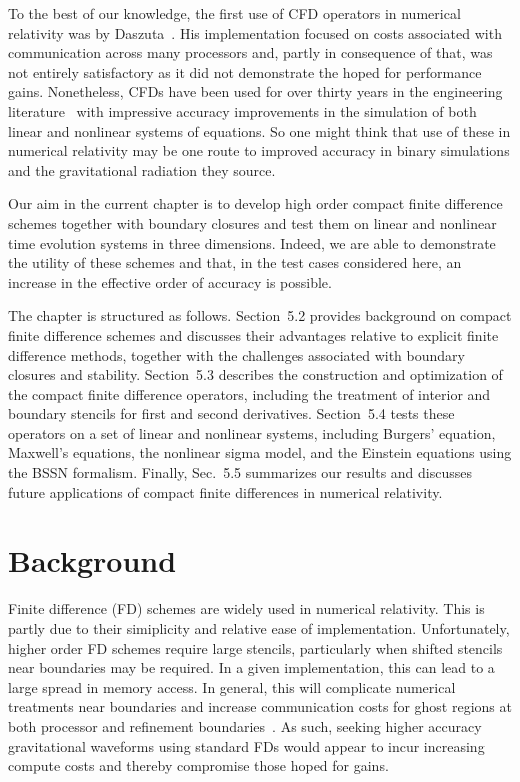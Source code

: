 To the best of our knowledge, the first use of CFD operators in numerical
relativity was by Daszuta~\cite{Daszuta2024}.  His implementation
focused on costs associated with communication across many processors and,
partly in consequence of that, was not entirely satisfactory as it did not
demonstrate the hoped for performance gains.
Nonetheless, CFDs have been used for over thirty years in the engineering
literature~\cite{Lele1992,Kim2007,WuKim2024,VisbalGaitonde2002,BradyLivescu2019} with impressive accuracy improvements
in the simulation of both linear and nonlinear systems of equations.  So one might think that use of these in numerical relativity may be one route to improved accuracy in binary simulations and the gravitational radiation they source.

Our aim in the current chapter is to develop high order compact finite difference schemes together with boundary closures and test them on linear and nonlinear time evolution systems in three dimensions.
Indeed, we are able to demonstrate the utility of these schemes and that, in the test cases considered here, an increase in the effective order of accuracy is possible.


The chapter is structured as follows. Section~5.2 provides background on compact finite difference schemes and discusses their advantages relative to explicit finite difference methods, together with the challenges associated with boundary closures and stability. Section~5.3 describes the construction and optimization of the compact finite difference operators, including the treatment of interior and boundary stencils for first and second derivatives. Section~5.4 tests these operators on a set of linear and nonlinear systems, including Burgers' equation, Maxwell's equations, the nonlinear sigma model, and the Einstein equations using the BSSN formalism. Finally, Sec.~5.5 summarizes our results and discusses future applications of compact finite differences in numerical relativity.
\section{Background}
\label{sec:background}

Finite difference (FD) schemes are widely used in numerical relativity.  This is partly due to their simiplicity and relative ease of implementation. Unfortunately,
higher order FD schemes require large stencils, particularly when shifted stencils near boundaries may be required.  In a given implementation, this can lead to a large spread in memory access.  In general, this will 
complicate numerical treatments near boundaries and increase 
communication costs for ghost regions at both processor and refinement boundaries~\cite{Fernando2019,KimSandberg2012,Kim2013,Daszuta2024}. 
As such, seeking higher accuracy gravitational waveforms using standard FDs would appear to incur increasing compute costs and thereby compromise those hoped for gains.

